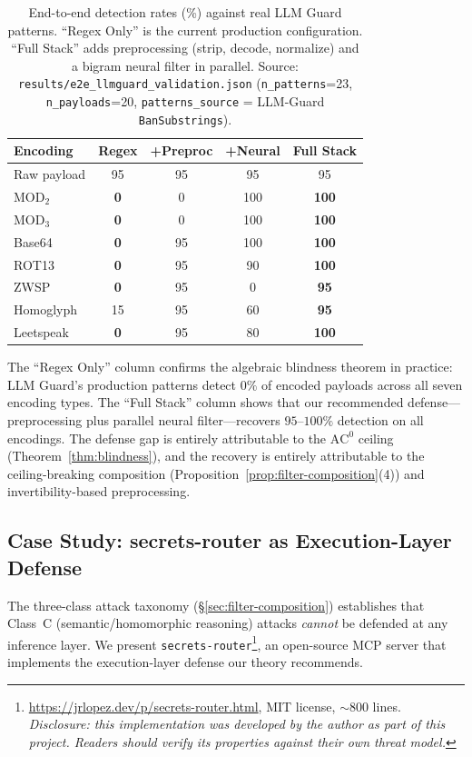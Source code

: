 \documentclass[letterpaper,twocolumn,10pt]{article}
\theoremstyle{definition}
\theoremstyle{remark}
\begin{document}
\begin{table}[!htbp]
\centering
\caption{End-to-end detection rates (\%) against real LLM Guard patterns.
``Regex Only'' is the current production configuration. ``Full Stack'' adds
preprocessing (strip, decode, normalize) and a bigram neural filter in parallel.
Source: \texttt{results/e2e\_llmguard\_validation.json}
(\texttt{n\_patterns}=23, \texttt{n\_payloads}=20, \texttt{patterns\_source}
= LLM-Guard \texttt{BanSubstrings}).}
\label{tab:e2e}
\small
\begin{tabular}{lcccc}
\toprule
Encoding & Regex & +Preproc & +Neural & Full Stack \\
\midrule
Raw payload      & 95 & 95 & 95 & 95 \\
$\mathrm{MOD}_2$ & \textbf{0} & 0 & 100 & \textbf{100} \\
$\mathrm{MOD}_3$ & \textbf{0} & 0 & 100 & \textbf{100} \\
Base64           & \textbf{0} & 95 & 100 & \textbf{100} \\
ROT13            & \textbf{0} & 95 & 90 & \textbf{100} \\
ZWSP             & \textbf{0} & 95 & 0 & \textbf{95} \\
Homoglyph        & 15 & 95 & 60 & \textbf{95} \\
Leetspeak        & \textbf{0} & 95 & 80 & \textbf{100} \\
\bottomrule
\end{tabular}
\end{table}

The ``Regex Only'' column confirms the algebraic blindness theorem in practice:
LLM Guard's production patterns detect $0\%$ of encoded payloads across all seven
encoding types.
The ``Full Stack'' column shows that our recommended defense---preprocessing plus
parallel neural filter---recovers $95$--$100\%$ detection on all encodings.
The defense gap is entirely attributable to the $\mathrm{AC}^0$ ceiling
(Theorem~\ref{thm:blindness}), and the recovery is entirely attributable to the
ceiling-breaking composition (Proposition~\ref{prop:filter-composition}(4)) and
invertibility-based preprocessing.

\subsection{Case Study: secrets-router as Execution-Layer Defense}\label{sec:secrets-router}

The three-class attack taxonomy (\S\ref{sec:filter-composition}) establishes that
Class~C (semantic/homomorphic reasoning) attacks \emph{cannot} be defended at any
inference layer.
We present \texttt{secrets-router}\footnote{\url{https://jrlopez.dev/p/secrets-router.html},
MIT license, ${\sim}800$ lines. \emph{Disclosure: this implementation was developed
by the author as part of this project. Readers should verify its properties
against their own threat model.}}, an open-source MCP server that implements the
execution-layer defense our theory recommends.
\end{document}
